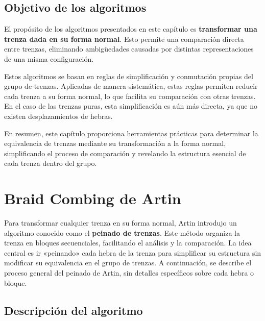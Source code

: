 \newpage

\subsection{Objetivo de los algoritmos}

El propósito de los algoritmos presentados en este capítulo es \textbf{transformar una trenza dada en su forma normal}. Esto permite una comparación directa entre trenzas, eliminando ambigüedades causadas por distintas representaciones de una misma configuración.

Estos algoritmos se basan en reglas de simplificación y conmutación propias del grupo de trenzas. Aplicadas de manera sistemática, estas reglas permiten reducir cada trenza a su forma normal, lo que facilita su comparación con otras trenzas. En el caso de las trenzas puras, esta simplificación es aún más directa, ya que no existen desplazamientos de hebras.

En resumen, este capítulo proporciona herramientas prácticas para determinar la equivalencia de trenzas mediante su transformación a la forma normal, simplificando el proceso de comparación y revelando la estructura esencial de cada trenza dentro del grupo.

\newpage

\section{Braid Combing de Artin}

Para transformar cualquier trenza en su forma normal, Artin introdujo un algoritmo conocido como el \textbf{peinado de trenzas}. Este método organiza la trenza en bloques secuenciales, facilitando el análisis y la comparación. La idea central es ir «peinando» cada hebra de la trenza para simplificar su estructura sin modificar su equivalencia en el grupo de trenzas. A continuación, se describe el proceso general del peinado de Artin, sin detalles específicos sobre cada hebra o bloque.

\subsection{Descripción del algoritmo}

